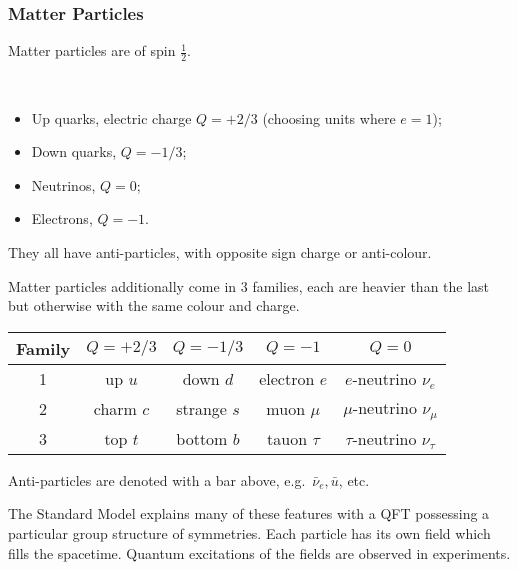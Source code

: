 \documentclass[a4paper,11pt]{article}
\begin{document}
	\subsubsection{Matter Particles} 
	Matter particles are of spin $\frac{1}{2}$.
	\begin{ex}
		\
		\begin{itemize}
			\item Up quarks, electric charge $Q = + 2/3$ (choosing units where $e = 1$);
			\item Down quarks, $Q = -1/3$; 
			\item Neutrinos, $Q = 0$;
			\item Electrons, $Q = -1$.
		\end{itemize}

		They all have anti-particles, with opposite sign charge or anti-colour.
	\end{ex}

	Matter particles additionally come in 3 families, each are heavier than the last but otherwise with the same colour and charge.

	\begin{table}[H]
		\centering
		\begin{tabular}{c|c|c|c|c}		
			\hline
			Family & $Q = + 2/3$ & $Q = - 1/3$ & $Q = -1$ & $Q = 0$ \\
			\hline
			1 & up $u$ & down $d$ & electron $e$ & $e$-neutrino $\nu_e$\\
			2 & charm $c$ & strange $s$ & muon $\mu$ & $\mu$-neutrino $\nu_\mu$\\
			3 & top $t$ & bottom $b$ & tauon $\tau$ & $\tau$-neutrino $\nu_\tau$\\
			\hline
		\end{tabular}		
	\end{table}

	Anti-particles are denoted with a bar above, e.g.\ $\bar{\nu}_e, \bar{u}$, etc.

	The Standard Model explains many of these features with a QFT possessing a particular group structure of symmetries. Each particle has its own field which fills the spacetime. Quantum excitations of the fields are observed in experiments.
\end{document}
